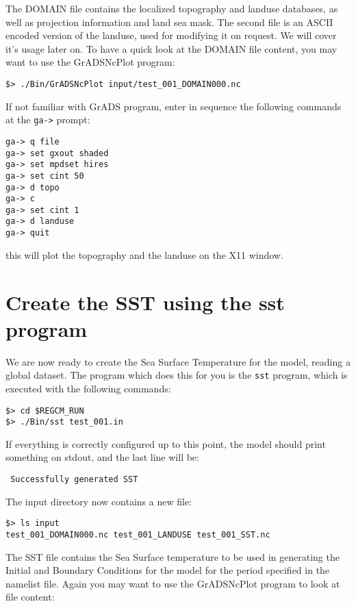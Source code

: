 The DOMAIN file contains the localized topography and landuse databases, as
well as projection information and land sea mask. The second file is an ASCII
encoded version of the landuse, used for modifying it on request. We will cover
it's usage later on.  To have a quick look at the DOMAIN file content, you may want
to use the GrADSNcPlot program:

\begin{Verbatim}
$> ./Bin/GrADSNcPlot input/test_001_DOMAIN000.nc
\end{Verbatim}

If not familiar with GrADS program, enter in sequence the following commands at
the \verb=ga->= prompt:

\begin{Verbatim}
ga-> q file
ga-> set gxout shaded
ga-> set mpdset hires
ga-> set cint 50
ga-> d topo
ga-> c
ga-> set cint 1
ga-> d landuse
ga-> quit
\end{Verbatim}

this will plot the topography and the landuse on the X11 window.

\section{Create the SST using the sst program}

We are now ready to create the Sea Surface Temperature for the model, reading a
global dataset.
The program which does this for you is the \verb=sst= program, which is executed
with the following commands:

\begin{Verbatim}
$> cd $REGCM_RUN
$> ./Bin/sst test_001.in
\end{Verbatim}

If everything is correctly configured up to this point, the model should print
something on stdout, and the last line will be:

\begin{Verbatim}
 Successfully generated SST
\end{Verbatim}

The input directory now contains a new file:

\begin{Verbatim}
$> ls input
test_001_DOMAIN000.nc test_001_LANDUSE test_001_SST.nc
\end{Verbatim}

The SST file contains the Sea Surface temperature to be used in generating the
Initial and Boundary Conditions for the model for the period specified in the
namelist file. Again you may want to use the GrADSNcPlot program to look at
file content:

